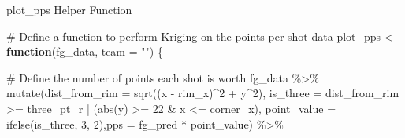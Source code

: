 \documentclass[
  9pt,
  ignorenonframetext,
  aspectratio=169]{beamer}
\newenvironment{Shaded}{\begin{snugshade}}{\end{snugshade}}
\newcommand{\AttributeTok}[1]{\textcolor[rgb]{0.00,0.34,0.68}{#1}}
\newcommand{\CommentTok}[1]{\textcolor[rgb]{0.54,0.53,0.53}{#1}}
\newcommand{\ControlFlowTok}[1]{\textcolor[rgb]{0.12,0.11,0.11}{\textbf{#1}}}
\newcommand{\DecValTok}[1]{\textcolor[rgb]{0.69,0.50,0.00}{#1}}
\newcommand{\FunctionTok}[1]{\textcolor[rgb]{0.39,0.29,0.61}{#1}}
\newcommand{\NormalTok}[1]{\textcolor[rgb]{0.12,0.11,0.11}{#1}}
\newcommand{\OtherTok}[1]{\textcolor[rgb]{0.00,0.43,0.16}{#1}}
\newcommand{\SpecialCharTok}[1]{\textcolor[rgb]{0.24,0.68,0.91}{#1}}
\newcommand{\StringTok}[1]{\textcolor[rgb]{0.75,0.01,0.01}{#1}}
\begin{document}
\begin{frame}[fragile]{plot\_pps Helper Function}
\label{plot_pps-helper-function}
\begin{Shaded}
\begin{Highlighting}[]
\CommentTok{\# Define a function to perform Kriging on the points per shot data}
\NormalTok{plot\_pps }\OtherTok{\textless{}{-}} \ControlFlowTok{function}\NormalTok{(fg\_data, }\AttributeTok{team =} \StringTok{""}\NormalTok{) \{}
  
  \CommentTok{\# Define the number of points each shot is worth}
\NormalTok{  fg\_data }\SpecialCharTok{\%\textgreater{}\%}
    \FunctionTok{mutate}\NormalTok{(}\AttributeTok{dist\_from\_rim =} \FunctionTok{sqrt}\NormalTok{((x }\SpecialCharTok{{-}}\NormalTok{ rim\_x)}\SpecialCharTok{\^{}}\DecValTok{2} \SpecialCharTok{+}\NormalTok{ y}\SpecialCharTok{\^{}}\DecValTok{2}\NormalTok{),}
      \AttributeTok{is\_three =}\NormalTok{ dist\_from\_rim }\SpecialCharTok{\textgreater{}=}\NormalTok{ three\_pt\_r }\SpecialCharTok{|}\NormalTok{ (}\FunctionTok{abs}\NormalTok{(y) }\SpecialCharTok{\textgreater{}=} \DecValTok{22} \SpecialCharTok{\&}\NormalTok{ x }\SpecialCharTok{\textless{}=}\NormalTok{ corner\_x),}
      \AttributeTok{point\_value =} \FunctionTok{ifelse}\NormalTok{(is\_three, }\DecValTok{3}\NormalTok{, }\DecValTok{2}\NormalTok{),}\AttributeTok{pps =}\NormalTok{ fg\_pred }\SpecialCharTok{*}\NormalTok{ point\_value) }\SpecialCharTok{\%\textgreater{}\%}
    

\end{Highlighting}
\end{Shaded}
\end{frame}
\end{document}
